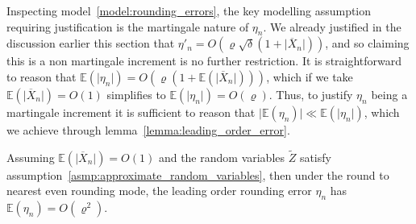 \documentclass[manuscript,review]{acmart}
\begin{document}
Inspecting model~\ref{model:rounding_errors}, the key modelling assumption requiring justification is the martingale nature of $ \eta_n $. We already justified in the discussion earlier this section that $ \eta'_n = O(\varrho\sqrt{\delta} (1 + \lvert \overline{X}_n\rvert)) $, and so claiming this is a non martingale increment is no further restriction. It is straightforward to reason that $ \mathbb{E}(\lvert \eta_n\rvert) = O(\varrho (1 + \mathbb{E}(\lvert\overline{X}_n\rvert))) $, which if we take $ \mathbb{E}(\lvert \overline{X}_n\rvert ) = O(1) $ simplifies to $ \mathbb{E}(\lvert \eta_n\rvert ) = O(\varrho) $. Thus, to justify $ \eta_n $ being a martingale increment it is sufficient to reason that $ \lvert \mathbb{E}(\eta_n)\rvert \ll \mathbb{E}(\lvert \eta_n\rvert )$, which we achieve through lemma~\ref{lemma:leading_order_error}.

\begin{lemma}
\label{lemma:leading_order_error}
Assuming $ \mathbb{E}(\lvert \overline{X}_n\rvert ) = O(1) $ and the random variables $ \widetilde{Z} $ satisfy assumption~\ref{asmp:approximate_random_variables}, then under the round to nearest even rounding mode, the leading order rounding error $ \eta_n $ has $ \mathbb{E}(\eta_n) = O(\varrho^2) $.
\end{lemma}
\end{document}
